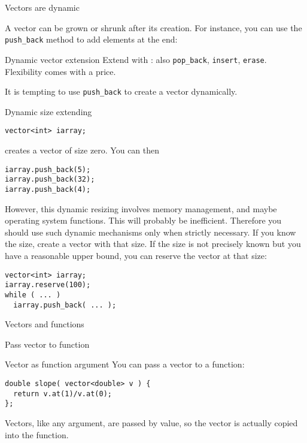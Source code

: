  {Vectors are dynamic}
\label{sec:stdvector-dynamic}

A vector
can be grown or shrunk after its creation.
For instance, you can use the \lstinline{push_back} method to add elements at the end:

\begin{block}{Dynamic vector extension}
  \label{sl:vector-dynamic}
  Extend with :
  also \lstinline{pop_back}, \lstinline{insert}, \lstinline{erase}.\\
  Flexibility comes with a price.
\end{block}

It is tempting to use \lstinline{push_back} to create a vector dynamically.

\begin{block}{Dynamic size extending}
  \label{sl:vector-extend}
\begin{lstlisting}
vector<int> iarray;
\end{lstlisting}
creates a vector of size zero. You can then
\begin{lstlisting}
iarray.push_back(5);
iarray.push_back(32);
iarray.push_back(4);
\end{lstlisting}
\end{block}

However, this dynamic resizing involves memory management, and maybe
operating system functions. This will probably be
inefficient. Therefore you should use such dynamic mechanisms only
when strictly necessary.
If you know the size,
create a vector with that size. If the size is not precisely known but
you have a reasonable upper bound, you can 
reserve the vector at that size:
\begin{lstlisting}
vector<int> iarray;
iarray.reserve(100);
while ( ... )
  iarray.push_back( ... );
\end{lstlisting}

 {Vectors and functions}

 {Pass vector to function}

\begin{block}{Vector as function argument}
  \label{sl:vector-arg}
  You can pass a vector to a function:
\begin{lstlisting}
double slope( vector<double> v ) {
  return v.at(1)/v.at(0);
};
\end{lstlisting}
Vectors, like any argument, are passed by value, so the vector is
actually copied into the function.
\end{block}

